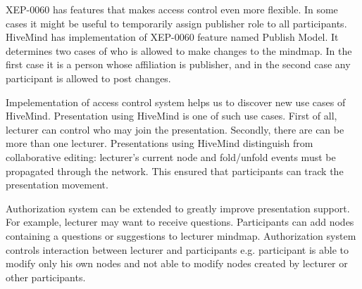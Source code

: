 XEP-0060 has features that makes access control even more flexible. In some
cases it might be useful to temporarily assign publisher role to all
participants. HiveMind has implementation of XEP-0060 feature named Publish
Model. It determines two cases of who is allowed to make changes to the
mindmap. In the first case it is a person whose affiliation is publisher, and in
the second case any participant is allowed to post changes.

Impelementation of access control system helps us to discover new use cases of
HiveMind. Presentation using HiveMind is one of such use cases. First of all,
lecturer can control who may join the presentation. Secondly, there are can be
more than one lecturer. Presentations using HiveMind distinguish from
collaborative editing: lecturer's current node and fold/unfold events must be
propagated through the network. This ensured that participants can track the
presentation movement.
 
Authorization system can be extended to greatly improve presentation
support. For example, lecturer may want to receive questions. Participants
can add nodes containing a questions or suggestions to lecturer mindmap.
Authorization system controls interaction between lecturer and participants e.g.
participant is able to modify only his own nodes and not able to modify nodes
created by lecturer or other participants.

